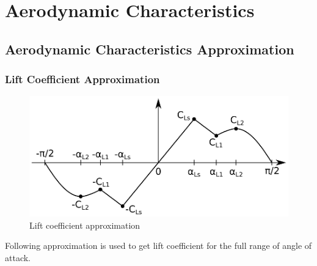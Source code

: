 \chapter{Aerodynamic Characteristics}

\section{Aerodynamic Characteristics Approximation}

\subsection{Lift Coefficient Approximation}

\begin{figure}[h!]
  \centering
  \includegraphics[width=120mm]{eps/approx_cz.eps}
  \caption{Lift coefficient approximation}
\end{figure}

Following approximation is used to get lift coefficient for the full range of angle of attack. \cite{NASA-TM-102267}

